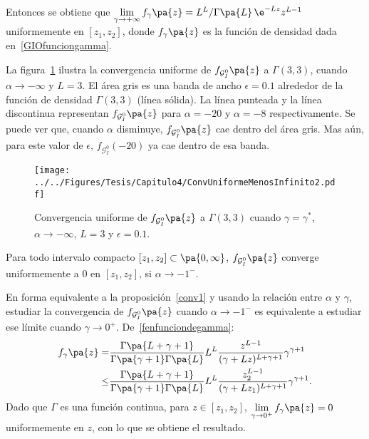 \begin{dem}
	Entonces se obtiene que $\lim\limits_{\gamma\to+\infty}f_{\gamma}\pa{z} = L^{L}/\Gamma\pa{L}\,\e^{-Lz}z^{L-1}$ uniformemente en $[z_{1},z_{2}]$, donde $f_{\gamma}\pa{z}$ es la función de densidad dada en~\eqref{GIOfunciongamma}.
\end{dem}

La figura~\ref{ConvInfinito} ilustra la convergencia uniforme de $f_{\mathcal{G}_I^0}\pa{z}$ a $\Gamma(3,3)$, cuando $\alpha \to -\infty$ y $L=3$. 
El área gris es una banda de ancho $\epsilon=0.1$ alrededor de la función de densidad $\Gamma(3,3)$ (línea sólida). 
La línea punteada y la línea discontinua representan $f_{\mathcal{G}_I^0}\pa{z}$ para $\alpha=-20$ y $\alpha=-8$ respectivamente. 
Se puede ver que, cuando $\alpha$ disminuye, $f_{\mathcal{G}_I^0}\pa{z}$ cae dentro del área gris. 
Mas aún, para este valor de $\epsilon$, $f_{\mathcal{G}_I^0}(-20)$ ya cae dentro de esa banda.


\begin{figure}[hbt]
\begin{center}
	\texttt{[image: ../../Figures/Tesis/Capitulo4/ConvUniformeMenosInfinito2.pdf]}
	\caption{\label{ConvInfinito}\small{Convergencia uniforme de $f_{\mathcal{G}_I^0}\pa{z}$ a $\Gamma(3,3)$ cuando $\gamma=\gamma^*$, $\alpha \to -\infty$, $L=3$ y $\epsilon=0.1$.}}
\end{center}
\end{figure} 


\begin{proposition}
	\label{conv2}
	Para todo intervalo compacto $[z_{1},z_{2}]\subset\pa{0,\infty}$, $f_{\mathcal{G}_I^0}\pa{z}$ converge
	uniformemente a $0$ en $[z_{1},z_{2}]$, si $\alpha\to -1^{-}$.
\end{proposition}
\begin{dem}
	En forma equivalente a la proposición~\ref{conv1} y usando la relación entre $\alpha$ y $\gamma$, estudiar la convergencia de $f_{\mathcal{G}_I^0}\pa{z}$ cuando $\alpha\to -1^{-}$ es equivalente a estudiar ese límite cuando ${\gamma\to 0^{+}}$.
	De~\eqref{fenfunciondegamma}:
	\begin{align*}
	f_{\gamma}\pa{z} = &\frac{\Gamma\pa{L+\gamma+1}}{\Gamma\pa{\gamma+1}\Gamma\pa{L}}
	L^{L} \frac{z^{L-1}}{(\gamma+Lz)^{L+\gamma+1}} \gamma^{\gamma +1}  \\
	\leq& \frac{\Gamma\pa{L+\gamma+1}}{\Gamma\pa{\gamma+1}\Gamma\pa{L}}
	L^{L} \frac{z_2^{L-1}}{(\gamma+Lz_1)^{L+\gamma+1}} \gamma^{\gamma +1} .
	\end{align*}
	Dado que $\Gamma$ es una función continua, para $z \in [z_{1},z_{2}]$, $\lim\limits_{\gamma\to0^+} f_{\gamma}\pa{z}=0$ uniformemente en $z$, con lo que se obtiene el resultado.
\end{dem}

